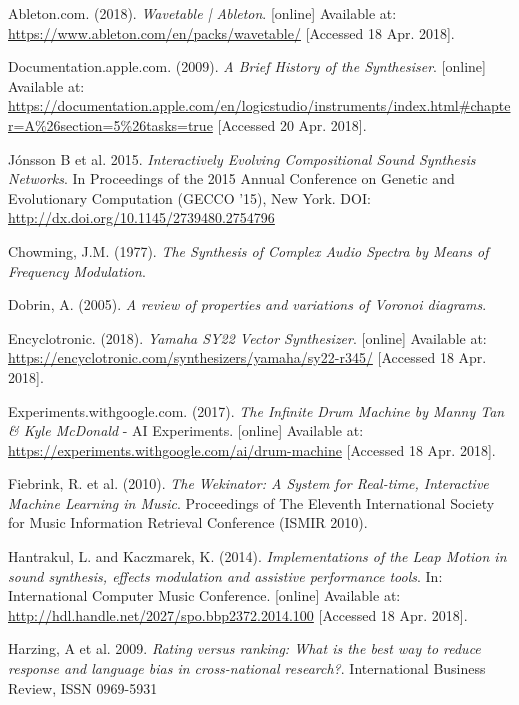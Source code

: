 \documentclass[11pt, oneside]{report}   	%
\begin{document}

\begin{thebibliography}{9}
\singlespacing

Ableton.com. (2018). \emph{Wavetable | Ableton}. [online] Available at: \url{https://www.ableton.com/en/packs/wavetable/} [Accessed 18 Apr. 2018].

Documentation.apple.com. (2009). \emph{A Brief History of the Synthesiser}. [online] Available at: \url{https://documentation.apple.com/en/logicstudio/instruments/index.html#chapter=A\%26section=5\%26tasks=true} [Accessed 20 Apr. 2018].

J\'{o}nsson B et al. 2015. \emph{Interactively Evolving Compositional Sound Synthesis Networks}. In Proceedings of the 2015 Annual Conference on Genetic and Evolutionary Computation (GECCO '15), New York. DOI: \url{http://dx.doi.org/10.1145/2739480.2754796}

Chowming, J.M. (1977). \emph{The Synthesis of Complex Audio Spectra by Means of Frequency Modulation}.

Dobrin, A. (2005). \emph{A review of properties and variations of Voronoi diagrams}. 

Encyclotronic. (2018). \emph{Yamaha SY22 Vector Synthesizer}. [online] Available at: \url{https://encyclotronic.com/synthesizers/yamaha/sy22-r345/} [Accessed 18 Apr. 2018].

Experiments.withgoogle.com. (2017). \emph{The Infinite Drum Machine by Manny Tan \& Kyle McDonald} - AI Experiments. [online] Available at: \url{https://experiments.withgoogle.com/ai/drum-machine} [Accessed 18 Apr. 2018].

Fiebrink, R. et al. (2010). \emph{The Wekinator: A System for Real-time, Interactive Machine Learning in Music}. Proceedings of The Eleventh International Society for Music Information Retrieval Conference (ISMIR 2010). 

Hantrakul, L. and Kaczmarek, K. (2014). \emph{Implementations of the Leap Motion in sound synthesis, effects modulation and assistive performance tools}. In: International Computer Music Conference. [online] Available at:  \url{http://hdl.handle.net/2027/spo.bbp2372.2014.100} [Accessed 18 Apr. 2018].

Harzing, A et al. 2009. \emph{Rating versus ranking: What is the best way to reduce response and language bias in cross-national research?}.
International Business Review,
ISSN 0969-5931


\end{thebibliography}
\end{document}
